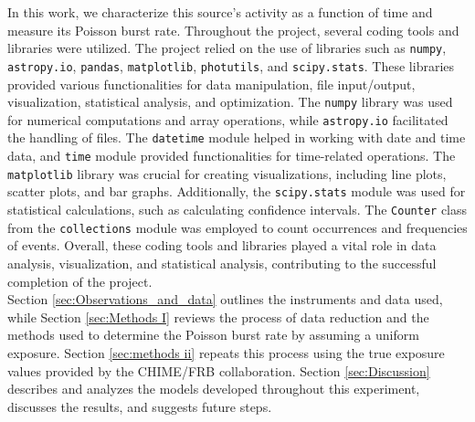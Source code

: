 \documentclass[twocolumn]{aastex631}
\begin{document}
\indent In this work, we characterize this source’s activity as a function of time and measure its Poisson burst rate. Throughout the project, several coding tools and libraries were utilized. The project relied on the use of libraries such as \texttt{numpy}, \texttt{astropy.io}, \texttt{pandas}, \texttt{matplotlib}, \texttt{photutils}, and \texttt{scipy.stats}. These libraries provided various functionalities for data manipulation, file input/output, visualization, statistical analysis, and optimization. The \texttt{numpy} library was used for numerical computations and array operations, while \texttt{astropy.io} facilitated the handling of files. The \texttt{datetime} module helped in working with date and time data, and \texttt{time} module provided functionalities for time-related operations. The \texttt{matplotlib} library was crucial for creating visualizations, including line plots, scatter plots, and bar graphs. Additionally, the \texttt{scipy.stats} module was used for statistical calculations, such as calculating confidence intervals. The \texttt{Counter} class from the \texttt{collections} module was employed to count occurrences and frequencies of events. Overall, these coding tools and libraries played a vital role in data analysis, visualization, and statistical analysis, contributing to the successful completion of the project.\\
\indent Section \ref{sec:Observations_and_data} outlines the instruments and data used, while Section \ref{sec:Methods I} reviews the process of data reduction and the methods used to determine the Poisson burst rate by assuming a uniform exposure. Section \ref{sec:methods ii} repeats this process using the true exposure values provided by the CHIME/FRB collaboration. Section \ref{sec:Discussion} describes and analyzes the models developed throughout this experiment, discusses the results, and suggests future steps.\\
\end{document}
